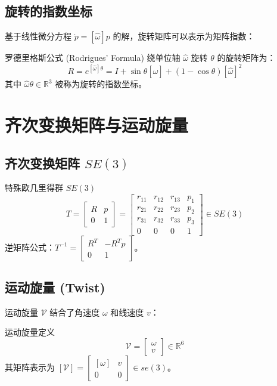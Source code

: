 \subsection{旋转的指数坐标}
基于线性微分方程 $\dot{p} = [\hat{\omega}]p$ 的解，旋转矩阵可以表示为矩阵指数：
\begin{formulabox}{罗德里格斯公式 (Rodrigues' Formula)}
绕单位轴 $\hat{\omega}$ 旋转 $\theta$ 的旋转矩阵为：
\begin{equation}
R = e^{[\hat{\omega}]\theta} = I + \sin\theta [\hat{\omega}] + (1 - \cos\theta) [\hat{\omega}]^2
\end{equation}
其中 $\hat{\omega}\theta \in \mathbb{R}^3$ 被称为旋转的指数坐标。
\end{formulabox}

\section{齐次变换矩阵与运动旋量}
\subsection{齐次变换矩阵 $SE(3)$}
\begin{defbox}{特殊欧几里得群 $SE(3)$}
\begin{equation}
T = \begin{bmatrix} R & p \\ 0 & 1 \end{bmatrix} = \begin{bmatrix} r_{11} & r_{12} & r_{13} & p_1 \\ r_{21} & r_{22} & r_{23} & p_2 \\ r_{31} & r_{32} & r_{33} & p_3 \\ 0 & 0 & 0 & 1 \end{bmatrix} \in SE(3)
\end{equation}
逆矩阵公式：$T^{-1} = \begin{bmatrix} R^T & -R^T p \\ 0 & 1 \end{bmatrix}$。
\end{defbox}

\subsection{运动旋量 (Twist)}
运动旋量 $\mathcal{V}$ 结合了角速度 $\omega$ 和线速度 $v$：
\begin{formulabox}{运动旋量定义}
\begin{equation}
\mathcal{V} = \begin{bmatrix} \omega \\ v \end{bmatrix} \in \mathbb{R}^6
\end{equation}
其矩阵表示为 $[\mathcal{V}] = \begin{bmatrix} [\omega] & v \\ 0 & 0 \end{bmatrix} \in se(3)$。
\end{formulabox}

